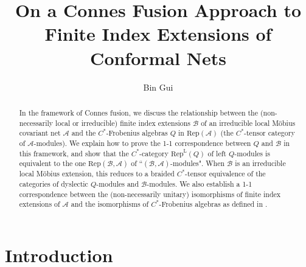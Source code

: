 \documentclass[12pt,a4paper,notitlepage]{article}
\title{On a Connes Fusion Approach to Finite Index Extensions of Conformal Nets}
\author{{\sc Bin Gui}
}
\date{}
\theoremstyle{definition}
\theoremstyle{plain}
\newcommand{\mc}{\mathcal}
\newcommand{\Rep}{\mathrm{Rep}}
\newcommand{\RepA}{\mathrm{Rep}(\mathcal A)}
\newcommand{\RepL}{\mathrm{Rep}^{\mathrm{L}}}
\numberwithin{equation}{section}
\begin{document}
\sloppy %
	\setcounter{section}{-1}
	
	
	
	\maketitle
	
	
\newcommand\blfootnote[1]{%
	\begingroup
	\renewcommand\thefootnote{}\footnote{#1}%
	\addtocounter{footnote}{-1}%
	\endgroup
}



\begin{abstract}
In the framework of Connes fusion, we discuss the relationship between the  (non-necessarily local or irreducible) finite index extensions $\mc B$ of an irreducible local M\"obius covariant net $\mc A$ and the $C^*$-Frobenius algebras $Q$ in $\RepA$ (the $C^*$-tensor category  of  $\mc A$-modules). We explain how to prove the 1-1 correspondence between $Q$ and $\mc B$ in this framework, and show that the $C^*$-category $\RepL(Q)$ of left $Q$-modules is equivalent to the one $\Rep(\mc B,\mc A)$ of ``$(\mc B,\mc A)$-modules". When $\mc B$ is an irreducible local M\"obius extension, this reduces to a braided $C^*$-tensor equivalence of the categories of dyslectic $Q$-modules and $\mc B$-modules. We also establish a 1-1 correspondence between the (non-necessarily unitary)  isomorphisms of finite index extensions of $\mc A$ and the isomorphisms of $C^*$-Frobenius algebras as defined in \cite{NY18}.
\end{abstract}


\tableofcontents




	


\section{Introduction}
\end{document}
